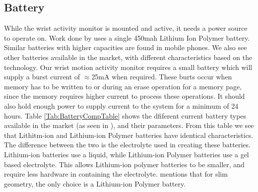 \subsection{Battery}
\label{Sec:Battery}

While the wrist activity monitor is mounted and active, it needs a power source to operate on.
Work done by \cite{Web:ShimmerHome} uses a single 450mah Lithium Ion Polymer battery.
Similar batteries with higher capacities are found in mobile phones. We also see other batteries available in the market,
with different characteristics based on the technology.
Our wrist motion activity monitor requires a small battery which will supply a burst current of $\approx$25mA when required.
These burts occur when memory has to be written to or during an erase operation for a memory page,
since the memory requires higher current to process these operations.
It should also hold enough power to supply current to the system for a minimum of 24 hours.
Table \ref{Tab:BatteryCompTable} shows the dfiferent current battery types available in the market (as seen in \cite{Web:BatteryTable}), and their parameters. From this table we see that Lithitm-ion and Lithium-ion Polymer batteries have identical characteristics.
The difference between the two is the electrolyte used in creating these batteries.
Lithium-ion batteries use a liquid,
while Lithium-ion Polymer batteries use a gel based electrolyte.
This allows Lithium-ion polymer batteries to be smaller,
and require less hardware in containing the electrolyte.
\cite{Web:BatteryTable} mentions that for slim geometry, the only choice is a Lithium-ion Polymer battery.


